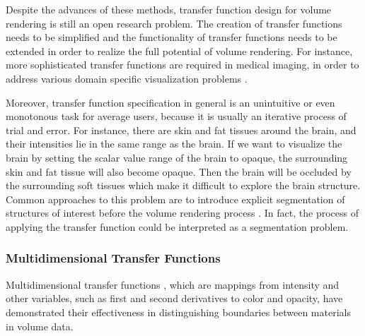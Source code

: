Despite the advances of these methods, transfer function design for volume rendering is still an open research problem.
The creation of transfer functions needs to be simplified and the functionality of transfer functions needs to be extended in order to realize the full potential of volume rendering. For instance, more sophisticated transfer functions are required in medical imaging, in order to address various domain specific visualization problems \cite{lindholm_spatial_2010}.

Moreover, transfer function specification in general is an unintuitive or even monotonous task for average users, because it is usually an iterative process of trial and error.
For instance, there are skin and fat tissues around the brain, and their intensities lie in the same range as the brain. If we want to visualize the brain by setting the scalar value range of the brain to opaque, the surrounding skin and fat tissue will also become opaque. Then the brain will be occluded by the surrounding soft tissues which make it difficult to explore the brain structure.
Common approaches to this problem are to introduce explicit segmentation of structures of interest before the volume rendering process \cite{rezk-salama_opacity_2006}. In fact, the process of applying the transfer function could be interpreted as a segmentation problem.

\subsubsection{Multidimensional Transfer Functions}
Multidimensional transfer functions \cite{kniss_interactive_2001}, which are mappings from intensity and other variables, such as first and second derivatives to color and opacity, have demonstrated their effectiveness in distinguishing boundaries between materials in volume data.


